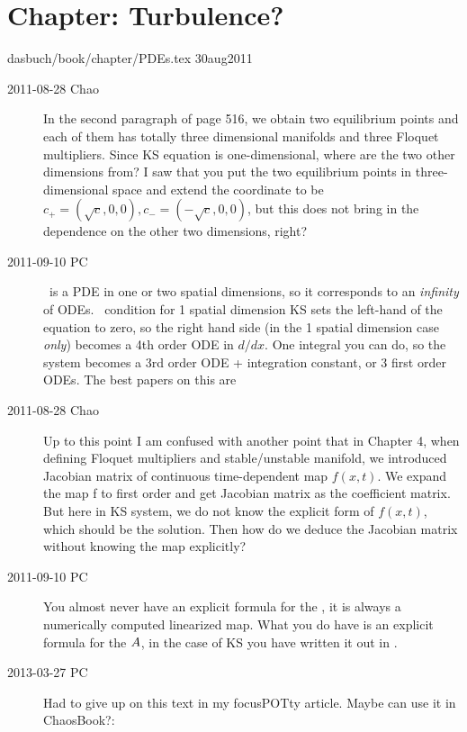 \section{Chapter: Turbulence?}
\label{c-PDEs}\noindent dasbuch/book/chapter/PDEs.tex 30aug2011
\begin{description}

\item[2011-08-28 Chao]
In the second paragraph of page 516, we obtain two equilibrium points and
each of them has totally three dimensional manifolds and three Floquet
multipliers. Since KS equation is one-dimensional, where are the two
other dimensions from? I saw that you put the two equilibrium points in
three-dimensional space and extend the coordinate to be $c_+ =
(\sqrt{c},0,0),c_- = (-\sqrt{c},0,0)$, but this does not bring in the
dependence on the other two dimensions, right?

\item[2011-09-10 PC]
\KSe\ is a PDE in one or two spatial dimensions, so it corresponds to an
\emph{infinity} of ODEs. \Eqv\ condition for 1 spatial dimension KS sets
the left-hand of the equation to zero, so the right hand side (in the 1
spatial dimension case \emph{only}) becomes a 4th order ODE in $d/dx$.
One integral you can do, so the system becomes a 3rd order ODE +
integration constant, or 3 first order ODEs. The best papers on this are

\item[2011-08-28 Chao]
Up to this point I am confused with another point that in Chapter 4, when
defining Floquet multipliers and stable/unstable manifold, we
introduced Jacobian matrix of continuous time-dependent map $f(x,t)$. We
expand the map f to first order and get Jacobian matrix as the
coefficient matrix. But here in KS system, we do not know the explicit
form of $f(x,t)$, which should be the solution. Then how do we deduce the
Jacobian matrix without knowing the map explicitly?

\item[2011-09-10 PC] You almost never have an explicit formula for the
\JacobianM, it is always a numerically computed linearized map. What you
do have is an explicit formula for the {\stabmat} ${A}$, in the case
of KS you have written it out in .

\item[2013-03-27 PC] Had to give up on
this text in my focusPOTty article. Maybe can use it in
ChaosBook?:


\end{description}

